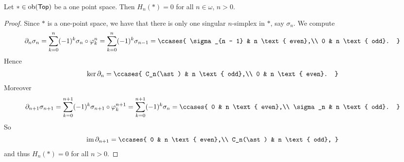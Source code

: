 \begin{proposition}
	Let $\ast \in \operatorname{ob}(\mathsf{Top})$ be a one point space. Then $H_n(\ast) = 0$ for all $n \in \omega$, $n > 0$.
\end{proposition}

\begin{proof}
	Since $\ast$ is a one-point space, we have that there is only one singular $n$-simplex in $\ast$, say $\sigma_n$. We compute
	\begin{equation*}
		\partial_n \sigma_n = \sum_{k = 0}^n(-1)^k \sigma_n \circ \varphi^n_k = \sum_{k = 0}^n (-1)^k\sigma_{n - 1} = \ccases{
			\sigma_{n - 1} & n \text{ even},\\
			0 & n \text{ odd}.
		}
	\end{equation*}
	Hence
	\begin{equation*}
		\ker \partial_n = \ccases{
			C_n(\ast) & n \text{ odd},\\
			0 & n \text{ even}.
		}
	\end{equation*}
	Moreover
	\begin{equation*}
		\partial_{n+1}\sigma_{n + 1} = \sum_{k = 0}^{n + 1}(-1)^k \sigma_{n + 1} \circ \varphi^{n+1}_k = \sum_{k = 0}^{n + 1} (-1)^k \sigma_n = \ccases{
			0 & n \text{ even},\\
			\sigma_n & n \text{ odd}.
		}
	\end{equation*}
	So
	\begin{equation*}
		\im \partial_{n + 1} = \ccases{
			0 & n \text{ even},\\
			C_n(\ast) & n \text{ odd},
		}
	\end{equation*}
	and thus $H_n(\ast) = 0$ for all $n > 0$.
\end{proof}
